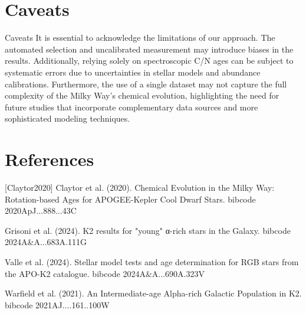 \documentclass[twocolumn]{aastex631}
\begin{document}
\section{Caveats}
Caveats
It is essential to acknowledge the limitations of our approach. The automated selection and uncalibrated measurement may introduce biases in the results. Additionally, relying solely on spectroscopic C/N ages can be subject to systematic errors due to uncertainties in stellar models and abundance calibrations. Furthermore, the use of a single dataset may not capture the full complexity of the Milky Way's chemical evolution, highlighting the need for future studies that incorporate complementary data sources and more sophisticated modeling techniques.
\section*{References}
\footnotesize
[Claytor2020] Claytor et al. (2020). Chemical Evolution in the Milky Way: Rotation-based Ages for APOGEE-Kepler Cool Dwarf Stars. bibcode 2020ApJ...888...43C \par [Grisoni2024] Grisoni et al. (2024). K2 results for "young" α-rich stars in the Galaxy. bibcode 2024A\&A...683A.111G \par [Valle2024] Valle et al. (2024). Stellar model tests and age determination for RGB stars from the APO-K2 catalogue. bibcode 2024A\&A...690A.323V \par [Warfield2021] Warfield et al. (2021). An Intermediate-age Alpha-rich Galactic Population in K2. bibcode 2021AJ....161..100W
\end{document}
